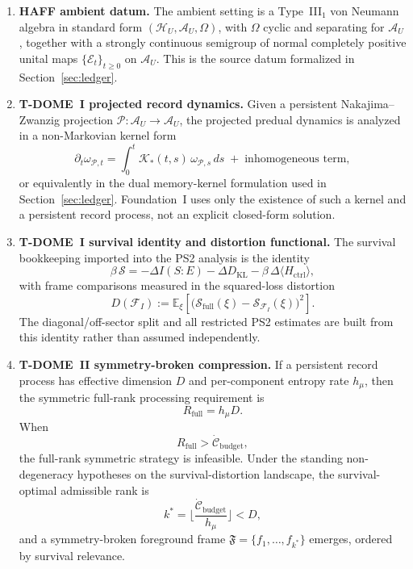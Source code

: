 \documentclass[12pt]{article}
\theoremstyle{definition}
\theoremstyle{remark}
\begin{document}
\begin{enumerate}
\item \textbf{HAFF ambient datum.}
The ambient setting is a Type~III\(_1\) von Neumann algebra in standard
form \((\mathcal H_U,\mathcal A_U,\Omega)\), with \(\Omega\) cyclic and
separating for \(\mathcal A_U\), together with a strongly continuous
semigroup of normal completely positive unital maps
\(\{\mathcal E_t\}_{t\ge 0}\) on \(\mathcal A_U\). This is the source
datum formalized in Section~\ref{sec:ledger}.

\item \textbf{T-DOME~I projected record dynamics.}
Given a persistent Nakajima--Zwanzig projection
\(\mathcal P:\mathcal A_U\to\mathcal A_U\), the projected predual
dynamics is analyzed in a non-Markovian kernel form
\[
\partial_t \omega_{\mathcal P,t}
=
\int_0^t \mathcal K_*(t,s)\,\omega_{\mathcal P,s}\,ds
\;+\; \text{inhomogeneous term},
\]
or equivalently in the dual memory-kernel formulation used in
Section~\ref{sec:ledger}. Foundation~I uses only the existence of such a
kernel and a persistent record process, not an explicit closed-form
solution.

\item \textbf{T-DOME~I survival identity and distortion functional.}
The survival bookkeeping imported into the PS2 analysis is the identity
\[
\beta\,\mathcal S
=
-\Delta I(S{:}E)
-\Delta D_{\mathrm{KL}}
-\beta\,\Delta\langle H_{\mathrm{ctrl}}\rangle,
\]
with frame comparisons measured in the squared-loss distortion
\[
D(\mathcal F_I)
:=
\mathbb E_\xi\!\left[
\bigl(
\mathcal S_{\mathrm{full}}(\xi)
-\mathcal S_{\mathcal F_I}(\xi)
\bigr)^2
\right].
\]
The diagonal/off-sector split and all restricted PS2 estimates are built
from this identity rather than assumed independently.

\item \textbf{T-DOME~II symmetry-broken compression.}
If a persistent record process has effective dimension \(D\) and
per-component entropy rate \(h_\mu\), then the symmetric full-rank
processing requirement is
\[
R_{\mathrm{full}}=h_\mu D.
\]
When
\[
R_{\mathrm{full}}
>
\dot{\mathcal C}_{\mathrm{budget}},
\]
the full-rank symmetric strategy is infeasible. Under the standing
non-degeneracy hypotheses on the survival-distortion landscape, the
survival-optimal admissible rank is
\[
k^*
=
\Big\lfloor
\frac{\dot{\mathcal C}_{\mathrm{budget}}}{h_\mu}
\Big\rfloor
< D,
\]
and a symmetry-broken foreground frame
\(\mathfrak F=\{f_1,\dots,f_{k^*}\}\) emerges, ordered by survival
relevance.


\end{enumerate}
\end{document}
